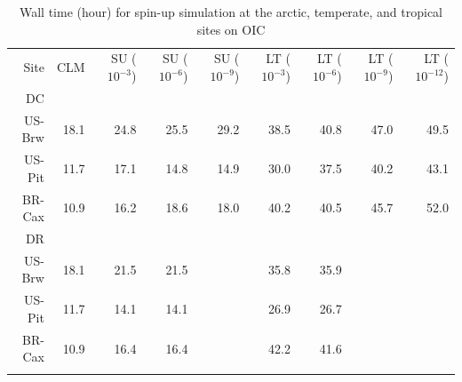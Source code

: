 \documentclass[gmd, manuscript]{copernicus}
\begin{document}
\begin{table}[t]
\caption{Wall time (hour) for spin-up simulation at the arctic, temperate, and tropical sites on OIC}
\label{tab:computingtime}
\begin{tabular}{rrrrrrrrr}
\tophline
Site & CLM  & SU ($10^{-3}$) & SU ($10^{-6}$) & SU ($10^{-9}$) & LT ($10^{-3}$) & LT ($10^{-6}$) & LT ($10^{-9}$) & LT ($10^{-12}$)\\
DC\\
US-Brw & 18.1 & 24.8 & 25.5 & 29.2 & 38.5 & 40.8 & 47.0 & 49.5 \\
US-Pit & 11.7 & 17.1 & 14.8 & 14.9 & 30.0 & 37.5 & 40.2 & 43.1 \\
BR-Cax & 10.9 & 16.2 & 18.6 & 18.0 & 40.2 & 40.5 & 45.7 & 52.0 \\
\middlehline
DR\\
US-Brw & 18.1 & 21.5 & 21.5 &      & 35.8 & 35.9 & \\
US-Pit & 11.7 & 14.1 & 14.1 &      & 26.9 & 26.7 & \\
BR-Cax & 10.9 & 16.4 & 16.4 &      & 42.2 & 41.6 & \\
\bottomhline
\end{tabular}
\end{table}
\end{document}
